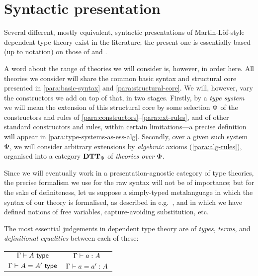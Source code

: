 

\section{Syntactic presentation}

\begin{para}Several different, mostly equivalent, syntactic presentations of Martin-Löf-style dependent type theory exist in the literature; the present one is essentially based (up to notation) on those of \cite{pitts:categorial-logic} and \cite{hofmann:syntax-and-semantics}.

A word about the range of theories we will consider is, however, in order here.  All theories we consider will share the common basic syntax and structural core presented in \ref{para:basic-syntax} and \ref{para:structural-core}.  We will, however, vary the constructors we add on top of that, in two stages.  Firstly, by a \emph{type system} we will mean the extension of this structural core by some selection ${\Phi}$ of the constructors and rules of \ref{para:constructors}--\ref{para:ext-rules}, and of other standard constructors and rules, within certain limitations---a precise definition will appear in \ref{para:type-systems-as-ess-alg}.  Secondly, over a given such system ${\Phi}$, we will consider arbitrary extensions by \emph{algebraic} axioms (\ref{para:alg-rules}), organised into a category $\mathbf{DTT}_{\Phi}$ of \emph{theories over ${\Phi}$}.
\end{para}

\begin{para} \label{para:basic-syntax}
Since we will eventually work in a presentation-agnostic category of type theories, the precise formalism we use for the raw syntax will not be of importance; but for the sake of definiteness, let us suppose a simply-typed metalanguage in which the syntax of our theory is formalised, as described in e.g.\ \cite[6.1]{pitts:categorial-logic}, and in which we have defined notions of free variables, capture-avoiding substitution, etc.

The most essential judgements in dependent type theory are of \emph{types}, \emph{terms}, and \emph{definitional equalities} between each of these:
\end{para}
\begin{center}\begin{tabular}{@{\ }c@{\hskip 0.75in}c@{\ }}
$\Gamma \vdash A \ \mathsf{type} $ & $ \Gamma \vdash a:A $ \\ \rule{0pt}{3ex} 
$\Gamma \vdash A = A' \ \mathsf{type} $& $ \Gamma \vdash a = a' : A $ \\
\end{tabular}
\end{center}

